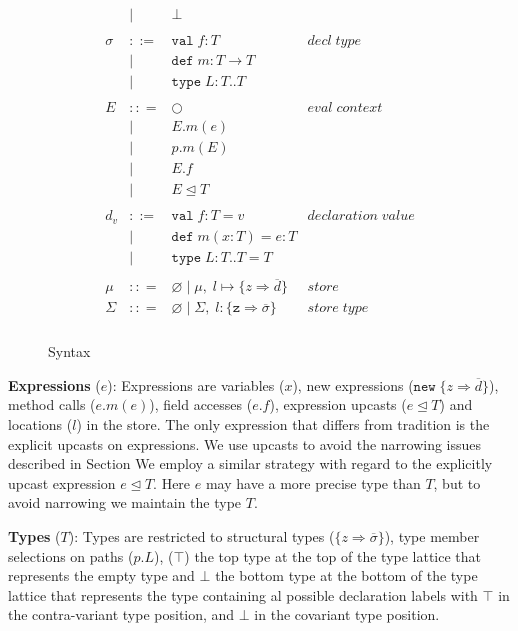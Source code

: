 \documentclass[11pt
              , a4paper
              , twoside
              , openright
              ]{report}
\numberwithin{case}{theorem}
\numberwithin{subcase}{case}
\begin{document}
\begin{figure}[h]
\[\begin{array}{lll}
\begin{array}{lllr}
& | & \bot & \\
&&\\
\sigma & ::= & \texttt{val} \; f:T & decl \; type\\
       & |   & \texttt{def} \; m:T \rightarrow T \\
		 & |   & \texttt{type} \; L : T .. T &\\
&&\\
E & :: = & \bigcirc & eval \; context\\
       & | & E.m(e)\\
       & | & p.m(E)\\
       & | & E.f\\
       & | & E \unlhd T\\
&&\\
d_v & ::= & \texttt{val} \; f : T = v & declaration \; value \\
  & |   & \texttt{def} \; m(x:T) = e : T &\\
  & |   & \texttt{type} \; L : T .. T = T &\\
&&\\
\mu & :: = & \varnothing \; | \; \mu,\; l \mapsto \{z \Rightarrow \overline{d}\} & store \\
\Sigma & :: = & \varnothing \; | \; \Sigma,\; l : \{\texttt{z} \Rightarrow \overline{\sigma}\} & store \; type \\
\end{array}
\end{array}
\]
\caption{Syntax}
\label{f:syntax}
\end{figure}

\textbf{Expressions} ($e$): Expressions are variables ($x$), new 
expressions ($\texttt{new} \; \{z \Rightarrow \overline{d}\}$), 
method calls ($e.m(e)$), field accesses ($e.f$), expression 
upcasts ($e \unlhd T$) and locations ($l$) in the store. The 
only expression that differs from tradition is the explicit upcasts on expressions. 
We use upcasts to avoid the narrowing issues described in Section
We employ a similar strategy with regard to the explicitly 
upcast expression $e \unlhd T$. Here $e$ may have a more precise 
type than $T$, but to avoid narrowing we maintain the type $T$.

\textbf{Types} ($T$): Types are restricted to structural types 
($\{z \Rightarrow \overline{\sigma}\}$), type member selections on 
paths ($p.L$), ($\top$) the top type at the top of the type lattice 
that represents the empty type and $\bot$ the bottom type at the 
bottom of the type lattice that represents the type containing 
al possible declaration labels with $\top$ in the contra-variant 
type position, and $\bot$ in the covariant type position.
\end{document}
